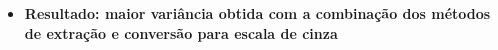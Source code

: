 \begin{itemize}

\item[] \textbf{Resultado: maior variância obtida com a combinação dos métodos de extração e conversão para escala de cinza}


\end{itemize}

